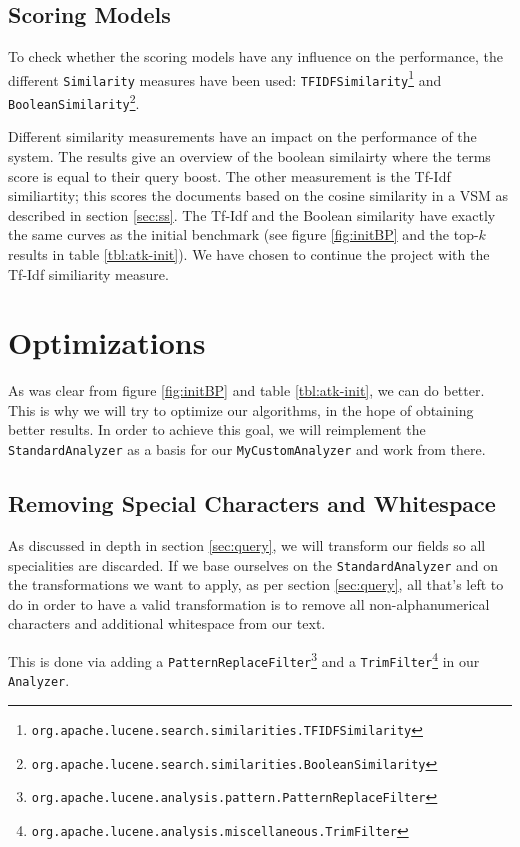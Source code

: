 \documentclass[11pt]{article}
\begin{document}
\subsection{Scoring Models}\label{sec:scmodels}
To check whether the scoring models have any influence on the performance, the different \texttt{Similarity} measures have been used: \texttt{TFIDFSimilarity}\footnote{\texttt{org.apache.lucene.search.similarities.TFIDFSimilarity}} and \texttt{BooleanSimilarity}\footnote{\texttt{org.apache.lucene.search.similarities.BooleanSimilarity}}. 

Different similarity measurements have an impact on the performance of the system. The results give an overview of the boolean similairty where the terms score is equal to their query boost. The other measurement is the Tf-Idf similiartity; this scores the documents based on the cosine similarity in a VSM as described in section \ref{sec:ss}. The Tf-Idf and the Boolean similarity have exactly the same curves as the initial benchmark (see figure \ref{fig:initBP} and the top-$k$ results in table \ref{tbl:atk-init}). We have chosen to continue the project with the Tf-Idf similiarity measure.

\section{Optimizations}\label{sec:optimizations}
As was clear from figure \ref{fig:initBP} and table \ref{tbl:atk-init}, we can do better. This is why we will try to optimize our algorithms, in the hope of obtaining better results. In order to achieve this goal, we will reimplement the \texttt{StandardAnalyzer} as a basis for our \texttt{MyCustomAnalyzer} and work from there.

\subsection{Removing Special Characters and Whitespace}
As discussed in depth in section \ref{sec:query}, we will transform our fields so all specialities are discarded. If we base ourselves on the \texttt{StandardAnalyzer} and on the transformations we want to apply, as per section \ref{sec:query}, all that's left to do in order to have a valid transformation is to remove all non-alphanumerical characters and additional whitespace from our text.

This is done via adding a \texttt{PatternReplaceFilter}\footnote{\texttt{org.apache.lucene.analysis.pattern.PatternReplaceFilter}} and a \texttt{TrimFilter}\footnote{\texttt{org.apache.lucene.analysis.miscellaneous.TrimFilter}} in our \texttt{Analyzer}.
\end{document}
